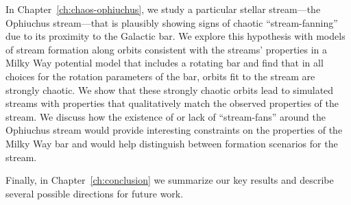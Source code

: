 In Chapter~\ref{ch:chaos-ophiuchus}, we study a particular stellar stream---the
Ophiuchus stream---that is plausibly showing signs of chaotic ``stream-fanning''
due to its proximity to the Galactic bar. We explore this hypothesis with models
of stream formation along orbits consistent with the streams' properties in a
Milky Way potential model that includes a rotating bar and find that in all
choices for the rotation parameters of the bar, orbits fit to the stream are
strongly chaotic. We show that these strongly chaotic orbits lead to simulated
streams with properties that  qualitatively match the observed properties of the
stream. We discuss how the existence of or lack of ``stream-fans'' around the
Ophiuchus stream would provide interesting constraints on the properties of the
Milky Way bar and would help distinguish between formation scenarios for the
stream.

Finally, in Chapter~\ref{ch:conclusion} we summarize our key results and
describe several possible directions for future work.
